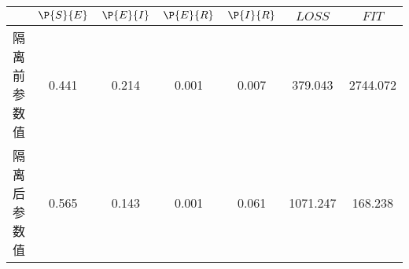 \begin{tabular}{ccccccc}
\hline
&$\P{S}{E}$&$\P{E}{I}$&$\P{E}{R}$&$\P{I}{R}$&$LOSS$&$FIT$\\
\hline
隔离前参数值&0.441&0.214&0.001&0.007&379.043&2744.072\\
隔离后参数值&0.565&0.143&0.001&0.061&1071.247&168.238\\
\hline
\end{tabular}